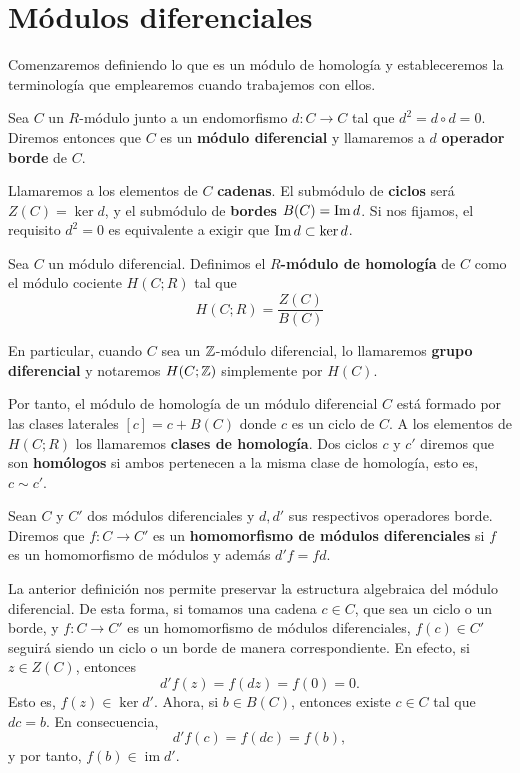 \section{Módulos diferenciales}

Comenzaremos definiendo lo que es un módulo de homología y estableceremos la terminología
que emplearemos cuando trabajemos con ellos.

\begin{definicion}
	Sea $C$ un $R$-módulo junto a un endomorfismo $d: C \rightarrow C$ tal que $d^{2}
	= d \circ d = 0$. Diremos entonces que $C$ es un \textbf{módulo diferencial} y
	llamaremos a $d$ \textbf{operador borde} de $C$.
\end{definicion}

Llamaremos a los elementos de $C$ \textbf{cadenas}. El submódulo de \textbf{ciclos}
será $Z(C) = \ker d$, y el submódulo de \textbf{bordes} $B(C) = \operatorname{Im} d$. Si nos
fijamos, el requisito $d^{2}= 0$ es equivalente a exigir que $\operatorname{Im}{d}\subset \ker{d}$.

\begin{definicion}
	Sea $C$ un módulo diferencial. Definimos el \textbf{$R$-módulo de homología} de
	$C$ como el módulo cociente $H(C;R)$ tal que
	\[
	H(C;R) = \frac{Z(C)}{B(C)}
	\]
\end{definicion}

En particular, cuando $C$ sea un $\mathbb{Z}$-módulo diferencial, lo llamaremos \textbf{grupo
	diferencial} y notaremos $H(C;\mathbb{Z})$ simplemente por $H(C)$.

Por tanto, el módulo de homología de un módulo diferencial $C$ está formado por
las clases laterales $[c] = c + B(C)$ donde $c$ es un ciclo de $C$. A los elementos
de $H(C;R)$ los llamaremos \textbf{clases de homología}. Dos ciclos $c$ y $c'$ diremos
que son \textbf{homólogos} si ambos pertenecen a la misma clase de homología, esto
es, $c \sim c'$.

\begin{definicion}
	Sean $C$ y $C'$ dos módulos diferenciales y $d, d'$ sus respectivos operadores
	borde. Diremos que $f: C \rightarrow C'$ es un \textbf{homomorfismo de módulos
		diferenciales} si $f$ es un homomorfismo de módulos y además $d'f = fd$.
\end{definicion}

La anterior definición nos permite preservar la estructura algebraica del módulo
diferencial. De esta forma, si tomamos una cadena $c \in C$, que sea un ciclo o
un borde, y $f\colon C \to C'$ es un homomorfismo de módulos diferenciales,
$f(c) \in C'$ seguirá siendo un ciclo o un borde de manera correspondiente. En efecto,
si $z \in Z(C)$, entonces
\[
d'f(z) = f(dz) = f(0) = 0.
\]
Esto es, $f(z) \in \ker d'$. Ahora, si $b \in B(C)$, entonces existe $c \in C$ tal
que $dc = b$. En consecuencia,
\[
d'f(c) = f(dc) = f(b),
\]
y por tanto, $f(b) \in \operatorname{im}d'$.

